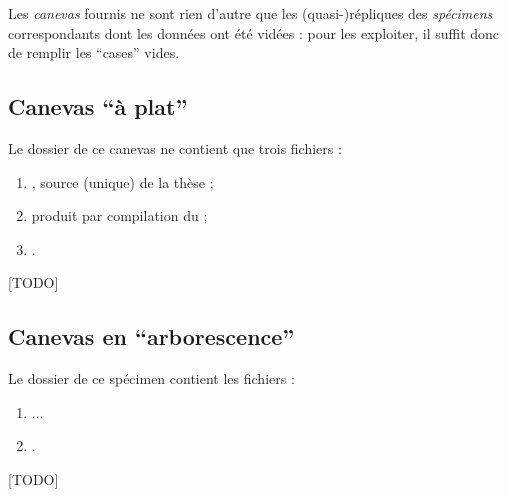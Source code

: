 Les \emph{canevas} fournis ne sont rien d'autre que les (quasi-)répliques des
\emph{spécimens} correspondants dont les données ont été vidées : pour les
exploiter, il suffit donc de remplir les \enquote{cases} vides.

\subsection[Canevas \enquote{à plat}]{Canevas \enquote{à plat} }
\label{sec-canevas-a-plat}


Le dossier de ce canevas %
ne contient que trois fichiers :
\begin{enumerate}
\item {}, source  (unique) de la thèse  ;
\item {} produit par compilation du  ;
\item {}.
\end{enumerate}

[TODO]

\subsection[Canevas en \enquote{arborescence}]{Canevas en \enquote{arborescence} }
\label{sec-canevas-arborescence}


Le dossier de ce spécimen %
contient les fichiers :
\begin{enumerate}
\item ...
\item {}.
\end{enumerate}

[TODO]

%
\iffalse
\fi

